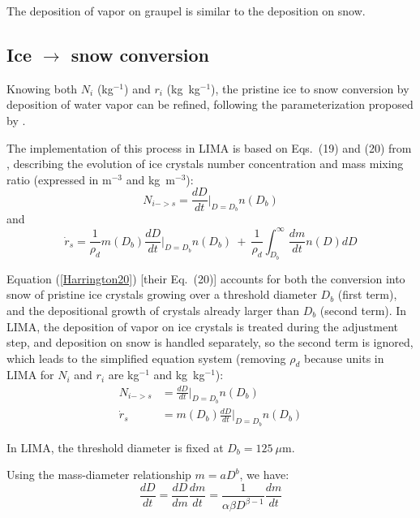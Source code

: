{The deposition of vapor on graupel is similar to the deposition on snow.

\subsection{Ice $\rightarrow$ snow conversion}

Knowing both $N_i$ (kg$^{-1}$) and $r_i$ (kg~kg$^{-1}$), the pristine ice to snow conversion by deposition of water vapor can be refined, following the parameterization proposed by \citet{Harrington1995}.

The implementation of this process in LIMA is based on Eqs.\ (19) and (20) from \citet{Harrington1995}, describing the evolution of ice crystals number concentration and mass mixing ratio (expressed in m$^{-3}$ and kg~m$^{-3}$):
\begin{equation}
\label{Harrington19}
 N_{i->s} = \frac{dD}{dt}\bigg|_{D=D_b}n(D_b)
\end{equation}
and
\begin{equation}
\label{Harrington20}
 \dot{r}_s = \frac{1}{\rho_d}m(D_b)\frac{dD}{dt}\bigg|_{D=D_b}n(D_b) ~ + ~ \frac{1}{\rho_d}\int^\infty_{D_b}\frac{dm}{dt}n(D)dD
\end{equation}

Equation (\ref{Harrington20}) [their Eq.\ (20)] accounts for both the conversion into snow of pristine ice crystals growing over a threshold diameter $D_b$ (first term), and the depositional growth of crystals already larger than $D_b$ (second term). In LIMA, the deposition of vapor on ice crystals is treated during the adjustment step, and deposition on snow is handled separately, so the second term is ignored, which leads to the simplified equation system (removing $\rho_d$ because units in LIMA for $N_i$ and $r_i$ are kg$^{-1}$ and kg~kg$^{-1}$):
\begin{align}
  N_{i->s} &= \frac{dD}{dt}\bigg|_{D=D_b}n(D_b) \\
 \dot{r}_s &= m(D_b)\frac{dD}{dt}\bigg|_{D=D_b}n(D_b)
\end{align}

In LIMA, the threshold diameter is fixed at $D_b = 125~\mu$m.

Using the mass-diameter relationship $m=a D^b$, we have:
\begin{equation}
 \frac{dD}{dt}=\frac{dD}{dm}\frac{dm}{dt}=\frac{1}{\alpha\beta D^{\beta -1}}\frac{dm}{dt}
\end{equation}

}

